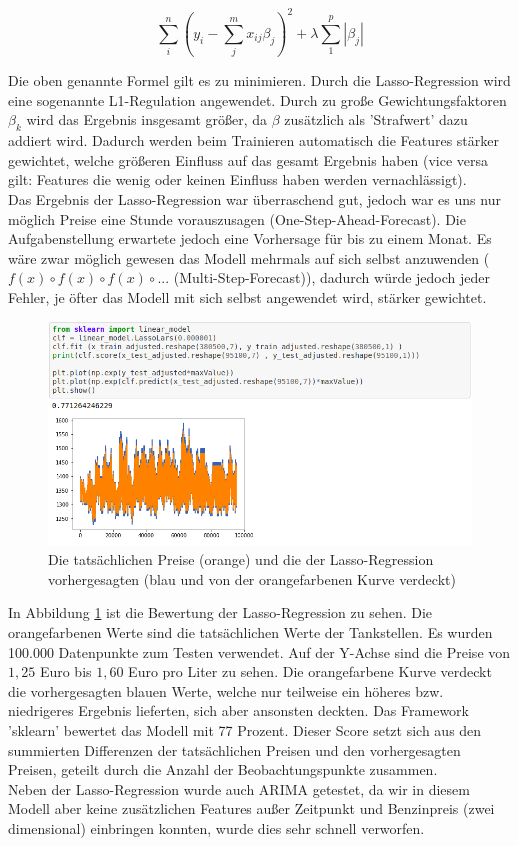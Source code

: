 \documentclass[
ngerman          %
,a4paper          %
,11pt
,pdftex
]{report}
\begin{document}
$$ \sum_{i}^{n}(y_i - \sum_{j}^{m} x_{ij}\beta_j)^2 + \lambda \sum_{1}^{p} |\beta_j| $$

Die oben genannte Formel gilt es zu minimieren.
Durch die Lasso-Regression wird eine sogenannte L1-Regulation angewendet. Durch zu große Gewichtungsfaktoren $\beta_k$ wird das Ergebnis insgesamt größer, da $\beta$ zusätzlich als 'Strafwert' dazu addiert wird. Dadurch werden beim Trainieren automatisch die Features stärker gewichtet, welche größeren Einfluss auf das gesamt Ergebnis haben (vice versa gilt: Features die wenig oder keinen Einfluss haben werden vernachlässigt).\\
Das Ergebnis der Lasso-Regression war überraschend gut, jedoch war es uns nur möglich Preise eine Stunde vorauszusagen (One-Step-Ahead-Forecast). Die Aufgabenstellung erwartete jedoch eine Vorhersage für bis zu einem Monat. Es wäre zwar möglich gewesen das Modell mehrmals auf sich selbst anzuwenden ( $f(x) \circ f(x) \circ f(x) \circ ... $ (Multi-Step-Forecast)), dadurch würde jedoch jeder Fehler, je öfter das Modell mit sich selbst angewendet wird, stärker gewichtet.\\
\begin{figure}
	\centering
	\includegraphics[width=0.7\linewidth]{images/fehlversuch}
	\caption{Die tatsächlichen Preise (orange) und die der Lasso-Regression vorhergesagten (blau und von der orangefarbenen Kurve verdeckt)}
	\label{fig:fehlversuch}
\end{figure}
In Abbildung \ref{fig:fehlversuch} ist die Bewertung der Lasso-Regression zu sehen. Die orangefarbenen Werte sind die tatsächlichen Werte der Tankstellen. Es wurden 100.000 Datenpunkte zum Testen verwendet. Auf der Y-Achse sind die Preise von $1,25$ Euro bis $1,60$ Euro pro Liter zu sehen. Die orangefarbene Kurve verdeckt die vorhergesagten blauen Werte, welche nur teilweise ein höheres bzw. niedrigeres Ergebnis lieferten, sich aber ansonsten deckten. Das Framework 'sklearn' bewertet das Modell mit 77 Prozent.
Dieser Score setzt sich aus den summierten Differenzen der tatsächlichen Preisen und den vorhergesagten Preisen, geteilt durch die Anzahl der Beobachtungspunkte zusammen.\\
Neben der Lasso-Regression wurde auch ARIMA getestet, da wir in diesem Modell aber keine zusätzlichen Features außer Zeitpunkt und Benzinpreis (zwei dimensional) einbringen konnten, wurde dies sehr schnell verworfen.
\end{document}
